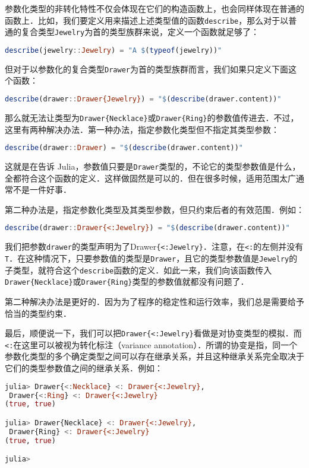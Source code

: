 参数化类型的非转化特性不仅会体现在它们的构造函数上，也会同样体现在普通的函数上．比如，我们要定义用来描述上述类型值的函数\verb|describe|，那么对于以普通的复合类型\verb|Jewelry|为首的类型族群来说，定义一个函数就足够了：
\begin{lstlisting}[language=julia]
describe(jewelry::Jewelry) = "A $(typeof(jewelry))"
\end{lstlisting}

但对于以参数化的复合类型\verb|Drawer|为首的类型族群而言，我们如果只定义下面这个函数：
\begin{lstlisting}[language=julia]
describe(drawer::Drawer{Jewelry}) = "$(describe(drawer.content))"
\end{lstlisting}

那么就无法让类型为\verb|Drawer{Necklace}|或\verb|Drawer{Ring}|的参数值传进去．不过，这里有两种解决办法．第一种办法，指定参数化类型但不指定其类型参数：
\begin{lstlisting}[language=julia]
describe(drawer::Drawer) = "$(describe(drawer.content))"
\end{lstlisting}

这就是在告诉 Julia，参数值只要是\verb|Drawer|类型的，不论它的类型参数值是什么，全都符合这个函数的定义．这样做固然是可以的．但在很多时候，适用范围太广通常不是一件好事．

第二种办法是，指定参数化类型及其类型参数，但只约束后者的有效范围．例如：
\begin{lstlisting}[language=julia]
describe(drawer::Drawer{<:Jewelry}) = "$(describe(drawer.content))"
\end{lstlisting}

我们把参数\verb|drawer|的类型声明为了Drawer\verb|{<:Jewelry}|．注意，在\verb|<:|的左侧并没有\verb|T|．在这种情况下，只要参数值的类型是\verb|Drawer|，且它的类型参数值是\verb|Jewelry|的子类型，就符合这个\verb|describe|函数的定义．如此一来，我们向该函数传入\verb|Drawer{Necklace}|或\verb|Drawer{Ring}|类型的参数值就都没有问题了．

第二种解决办法是更好的．因为为了程序的稳定性和运行效率，我们总是需要给予恰当的类型约束．

最后，顺便说一下，我们可以把\verb|Drawer{<:Jewelry}|看做是对协变类型的模拟．而\verb|<:|在这里可以被视为转化标注（variance annotation）．所谓的协变是指，同一个参数化类型的多个确定类型之间可以存在继承关系，并且这种继承关系完全取决于它们的类型参数值之间的继承关系．例如：
\begin{lstlisting}[language=julia]
julia> Drawer{<:Necklace} <: Drawer{<:Jewelry},
 Drawer{<:Ring} <: Drawer{<:Jewelry}
(true, true)

julia> Drawer{Necklace} <: Drawer{<:Jewelry},
 Drawer{Ring} <: Drawer{<:Jewelry}
(true, true)

julia> 
\end{lstlisting}

